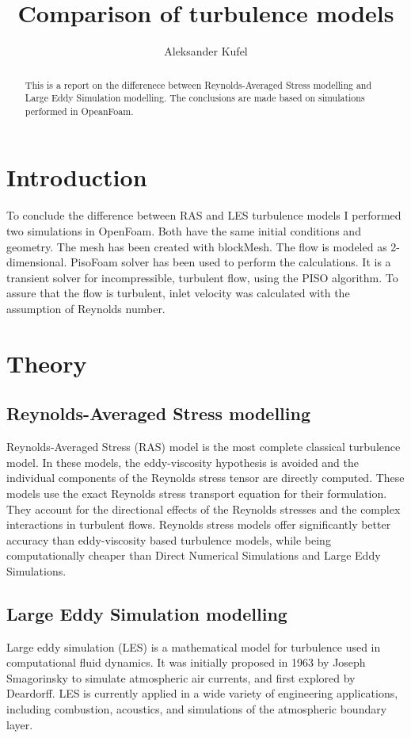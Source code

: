 \documentclass[a4paper]{article}
\title{Comparison of turbulence models}
\author{Aleksander Kufel}
\begin{document}
\maketitle

\begin{abstract}
This is a report on the differenece between Reynolds-Averaged Stress modelling and Large Eddy Simulation modelling. The conclusions are made based on simulations performed in OpeanFoam.
\end{abstract}

\section{Introduction}

To conclude the difference between RAS and LES turbulence models I performed two simulations in OpenFoam. Both have the same initial conditions and geometry. The mesh has been created with blockMesh. The flow is modeled as 2-dimensional. PisoFoam solver has been used to perform the calculations. It is a transient solver for incompressible, turbulent flow, using the PISO algorithm. To assure that the flow is turbulent, inlet velocity was calculated with the assumption of Reynolds number. 

\section{Theory}

\subsection{Reynolds-Averaged Stress modelling}
Reynolds-Averaged Stress (RAS) model is the most complete classical turbulence model. In these models, the eddy-viscosity hypothesis is avoided and the individual components of the Reynolds stress tensor are directly computed. These models use the exact Reynolds stress transport equation for their formulation. They account for the directional effects of the Reynolds stresses and the complex interactions in turbulent flows. Reynolds stress models offer significantly better accuracy than eddy-viscosity based turbulence models, while being computationally cheaper than Direct Numerical Simulations and Large Eddy Simulations.
    

\subsection{Large Eddy Simulation modelling}
Large eddy simulation (LES) is a mathematical model for turbulence used in computational fluid dynamics. It was initially proposed in 1963 by Joseph Smagorinsky to simulate atmospheric air currents, and first explored by Deardorff. LES is currently applied in a wide variety of engineering applications, including combustion, acoustics, and simulations of the atmospheric boundary layer.
\end{document}
